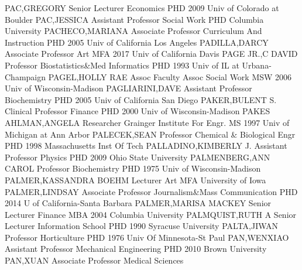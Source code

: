 \documentclass[
]{article}
\begin{document}
PAC,GREGORY \textbar Senior Lecturer \textbar Economics \textbar PHD
2009 Univ of Colorado at Boulder \textbar{} 
\textbar PAC,JESSICA \textbar Assistant Professor \textbar Social Work
\textbar PHD Columbia University \textbar{} 
\textbar PACHECO,MARIANA \textbar Associate Professor
\textbar Curriculum And Instruction \textbar PHD 2005 Univ of California
Los Angeles \textbar{}  \textbar PADILLA,DARCY
\textbar Associate Professor \textbar Art \textbar MFA 2017 Univ of
California Davis \textbar{}  \textbar PAGE JR.,C DAVID
\textbar Professor \textbar Biostatistics\&Med Informatics \textbar PHD
1993 Univ of IL at Urbana-Champaign \textbar{} 
\textbar PAGEL,HOLLY RAE \textbar Assoc Faculty Assoc \textbar Social
Work \textbar MSW 2006 Univ of Wisconsin-Madison \textbar{} 
\textbar PAGLIARINI,DAVE \textbar Assistant Professor
\textbar Biochemistry \textbar PHD 2005 Univ of California San Diego
\textbar{}  \textbar PAKER,BULENT S. \textbar Clinical
Professor \textbar Finance \textbar PHD 2000 Univ of Wisconsin-Madison
\textbar{}  \textbar PAKES AHLMAN,ANGELA \textbar Researcher
\textbar Grainger Institute For Engr. \textbar MS 1997 Univ of Michigan
at Ann Arbor \textbar{}  \textbar PALECEK,SEAN
\textbar Professor \textbar Chemical \& Biological Engr \textbar PHD
1998 Massachusetts Inst Of Tech \textbar{} 
\textbar PALLADINO,KIMBERLY J. \textbar Assistant Professor
\textbar Physics \textbar PHD 2009 Ohio State University \textbar{}
 \textbar PALMENBERG,ANN CAROL \textbar Professor
\textbar Biochemistry \textbar PHD 1975 Univ of Wisconsin-Madison
\textbar{}  \textbar PALMER,KASSANDRA BOEHM
\textbar Lecturer \textbar Art \textbar MFA University of Iowa
\textbar{}  \textbar PALMER,LINDSAY \textbar Associate
Professor \textbar Journalism\&Mass Communication \textbar PHD 2014 U of
California-Santa Barbara \textbar{}  \textbar PALMER,MARISA
MACKEY \textbar Senior Lecturer \textbar Finance \textbar MBA 2004
Columbia University \textbar{}  \textbar PALMQUIST,RUTH A
\textbar Senior Lecturer \textbar Information School \textbar PHD 1990
Syracuse University \textbar{}  \textbar PALTA,JIWAN
\textbar Professor \textbar Horticulture \textbar PHD 1976 Univ Of
Minnesota-St Paul \textbar{}  \textbar PAN,WENXIAO
\textbar Assistant Professor \textbar Mechanical Engineering
\textbar PHD 2010 Brown University \textbar{} 
\textbar PAN,XUAN \textbar Associate Professor \textbar Medical Sciences
\end{document}

